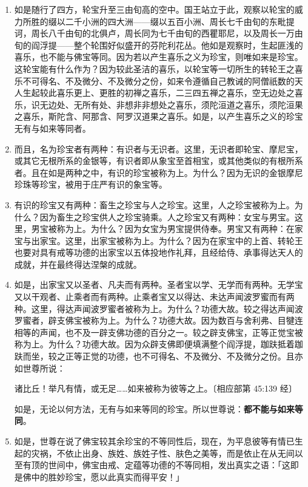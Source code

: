 \begin{enumerate}
\item 如是随行了四方，轮宝升至三由旬高的空中。国王站立于此，观察以轮宝的威力所胜的缀以二千小洲的四大洲——缀以五百小洲、周长七千由旬的东毗提诃，周长八千由旬的北俱卢，周长同为七千由旬的西瞿耶尼，以及周长一万由旬的阎浮提——整个轮围好似盛开的芬陀利花丛。他如是观察时，生起匪浅的喜乐，也不能与佛宝等同。因为若以产生喜乐之义为珍宝，则唯如来是珍宝。这轮宝能有什么作为？因为较此圣洁的喜乐，以轮宝等一切所生的转轮王之喜乐不可得名、不及微分、不及微分之份，如来令遵循自己教诫的阿僧祇数的天人生起较此喜乐更上、更胜的初禅之喜乐，二三四五禅之喜乐，空无边处之喜乐，识无边处、无所有处、非想非非想处之喜乐，须陀洹道之喜乐，须陀洹果之喜乐，斯陀含、阿那含、阿罗汉道果之喜乐。如是，以产生喜乐之义的珍宝无有与如来等同者。
\item 而且，名为珍宝者有两种：有识者与无识者。这里，无识者即轮宝、摩尼宝，或其它无根所系的金银等，有识者即从象宝至首相宝，或其他类似的有根所系者。且在如是两种之中，有识的珍宝被称为上。为什么？因为无识的金银摩尼珍珠等珍宝，被用于庄严有识的象宝等。
\item 有识的珍宝又有两种：畜生之珍宝与人之珍宝。这里，人之珍宝被称为上。为什么？因为畜生之珍宝供人之珍宝骑乘。人之珍宝又有两种：女宝与男宝。这里，男宝被称为上。为什么？因为女宝为男宝提供侍奉。男宝又有两种：在家宝与出家宝。这里，出家宝被称为上。为什么？因为在家宝中的上首、转轮王也要对具有戒等功德的出家宝以五体投地作礼拜，且经给侍、承事得达天人的成就，并在最终得达涅槃的成就。
\item 如是，出家宝又以圣者、凡夫而有两种。圣者宝以学、无学而有两种。无学宝又以干观者、止乘者而有两种。止乘者宝又以得达、未达声闻波罗蜜而有两种。这里，得达声闻波罗蜜者被称为上。为什么？功德大故。较之得达声闻波罗蜜者，辟支佛宝被称为上。为什么？功德大故。因为数百与舍利弗、目犍连相等的声闻，也不及一辟支佛功德的百分之一。较之辟支佛宝，正等正觉宝被称为上。为什么？功德大故。因为众辟支佛即便填满整个阎浮提，跏趺抵着跏趺而坐，较之正等正觉的功德，也不可得名、不及微分、不及微分之份。且亦如世尊所说：\begin{quoting}诸比丘！举凡有情，或无足……如来被称为彼等之上。{\bluefootnotesize 〔相应部第 45:139 经〕}\end{quoting}如是，无论以何方法，无有与如来等同的珍宝。所以世尊说：\textbf{都不能与如来等同}。
\item 如是，世尊在说了佛宝较其余珍宝的不等同性后，现在，为平息彼等有情已生起的灾祸，不依止出身、族姓、族姓子性、肤色之美等，而是依止在从无间以至有顶的世间中，佛宝由戒、定蕴等功德的不等同相，发出真实之语：「这即是佛中的胜妙珍宝，愿以此真实而得平安！」

\end{enumerate}
